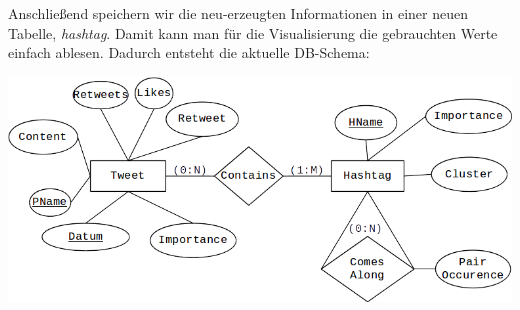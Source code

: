 \documentclass[paper=a4, english, ngerman, romanian]{scrartcl}
\begin{document}
		Anschließend speichern wir die neu-erzeugten Informationen in einer neuen Tabelle, \textit{hashtag}. Damit kann man für die Visualisierung die gebrauchten Werte einfach ablesen. Dadurch entsteht die aktuelle DB-Schema:
		
		\begin{center}
			\includegraphics[scale=0.6]{src/MinMax_Diagram}
		\end{center}
		
		
\end{document}
